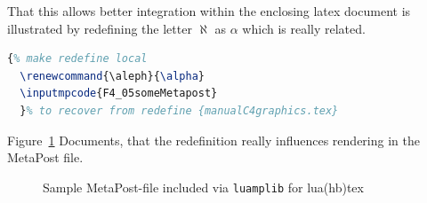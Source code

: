 That this allows better integration within the enclosing latex document 
is illustrated by redefining the letter $\aleph$ as $\alpha$ which is really related. 
%
\begin{lstlisting}[language=TeX]
  {% make redefine local 
  \renewcommand{\aleph}{\alpha}
  \inputmpcode{F4_05someMetapost}
  }% to recover from redefine {manualC4graphics.tex}
\end{lstlisting}

Figure~\ref{fig:metapostLua} Documents, 
that the redefinition really influences rendering in the MetaPost file. 

\begin{figure}[htb]
  \centering
  \caption{\label{fig:metapostLua}
  Sample MetaPost-file included via \texttt{luamplib} for lua(hb)tex } %
\end{figure}

  
  
  



  







